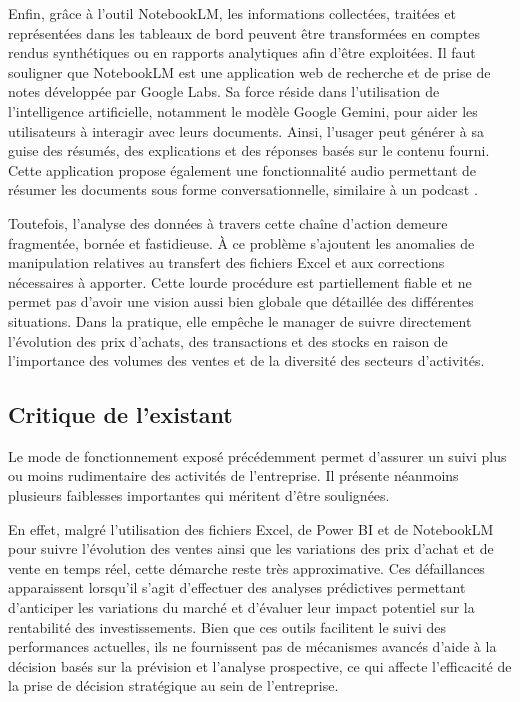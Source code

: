 \documentclass[a4paper,12pt]{report}
\begin{document}
Enfin, grâce à l'outil NotebookLM, les informations collectées, traitées et
représentées dans les tableaux de bord peuvent être transformées en comptes rendus
synthétiques ou en rapports analytiques afin d'être exploitées. Il faut souligner
que NotebookLM est une application web de recherche et de prise de notes
développée par Google Labs. Sa force réside dans l'utilisation de l'intelligence
artificielle, notamment le modèle Google Gemini, pour aider les utilisateurs à
interagir avec leurs documents. Ainsi, l'usager peut générer à sa guise des
résumés, des explications et des réponses basés sur le contenu fourni. Cette
application propose également une fonctionnalité audio permettant de résumer les
documents sous forme conversationnelle, similaire à un podcast \cite{ref3}.

Toutefois, l'analyse des données à travers cette chaîne d'action demeure
fragmentée, bornée et fastidieuse. À ce problème s'ajoutent les anomalies de
manipulation relatives au transfert des fichiers Excel et aux corrections
nécessaires à apporter. Cette lourde procédure est partiellement fiable et ne
permet pas d'avoir une vision aussi bien globale que détaillée des différentes
situations. Dans la pratique, elle empêche le manager de suivre directement
l'évolution des prix d'achats, des transactions et des stocks en raison de
l'importance des volumes des ventes et de la diversité des secteurs d'activités.

\subsection{Critique de l'existant}

Le mode de fonctionnement exposé précédemment permet d'assurer un suivi plus ou
moins rudimentaire des activités de l'entreprise. Il présente néanmoins plusieurs
faiblesses importantes qui méritent d'être soulignées.

En effet, malgré l'utilisation des fichiers Excel, de Power BI et de NotebookLM
pour suivre l'évolution des ventes ainsi que les variations des prix d'achat et
de vente en temps réel, cette démarche reste très approximative. Ces défaillances
apparaissent lorsqu'il s'agit d'effectuer des analyses prédictives permettant
d'anticiper les variations du marché et d'évaluer leur impact potentiel sur la
rentabilité des investissements. Bien que ces outils facilitent le suivi des
performances actuelles, ils ne fournissent pas de mécanismes avancés d'aide à la
décision basés sur la prévision et l'analyse prospective, ce qui affecte
l'efficacité de la prise de décision stratégique au sein de l'entreprise.
\end{document}
